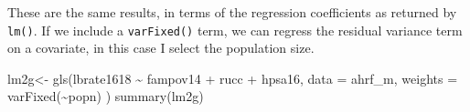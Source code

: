 \documentclass[
]{article}
\newenvironment{Shaded}{\begin{snugshade}}{\end{snugshade}}
\newcommand{\AttributeTok}[1]{\textcolor[rgb]{0.77,0.63,0.00}{#1}}
\newcommand{\FunctionTok}[1]{\textcolor[rgb]{0.00,0.00,0.00}{#1}}
\newcommand{\NormalTok}[1]{#1}
\newcommand{\OtherTok}[1]{\textcolor[rgb]{0.56,0.35,0.01}{#1}}
\newcommand{\SpecialCharTok}[1]{\textcolor[rgb]{0.00,0.00,0.00}{#1}}
\begin{document}
These are the same results, in terms of the regression coefficients as returned by \texttt{lm()}. If we include a \texttt{varFixed()} term, we can regress the residual variance term on a covariate, in this case I select the population size.

\begin{Shaded}
\begin{Highlighting}[]
\NormalTok{lm2g}\OtherTok{\textless{}{-}} \FunctionTok{gls}\NormalTok{(lbrate1618 }\SpecialCharTok{\textasciitilde{}}\NormalTok{  fampov14 }\SpecialCharTok{+}\NormalTok{ rucc }\SpecialCharTok{+}\NormalTok{ hpsa16,}
          \AttributeTok{data =}\NormalTok{ ahrf\_m, }
          \AttributeTok{weights =} \FunctionTok{varFixed}\NormalTok{(}\SpecialCharTok{\textasciitilde{}}\NormalTok{popn) )}
\FunctionTok{summary}\NormalTok{(lm2g)}
\end{Highlighting}
\end{Shaded}
\end{document}
